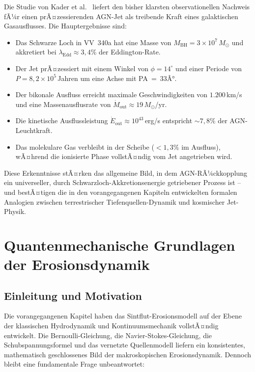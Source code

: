 ﻿\documentclass[12pt,a4paper]{report}
\begin{document}
Die Studie von Kader et al.\ \cite{kader2026} liefert den bisher klarsten observationellen Nachweis fÃ¼r einen prÃ¤zessierenden AGN-Jet als treibende Kraft eines galaktischen Gasausflusses. Die Hauptergebnisse sind:

\begin{itemize}
	\item Das Schwarze Loch in VV~340a hat eine Masse von $M_\mathrm{BH} = 3 \times 10^7\,M_\odot$ und akkretiert bei $\lambda_\mathrm{Edd} \approx 3{,}4\%$ der Eddington-Rate.
	\item Der Jet prÃ¤zessiert mit einem Winkel von $\phi = 14^\circ$ und einer Periode von $P = 8{,}2 \times 10^5$\,Jahren um eine Achse mit PA~=~33Â°.
	\item Der bikonale Ausfluss erreicht maximale Geschwindigkeiten von $1.200$\,km/s und eine Massenausflusrate von $\dot{M}_\mathrm{out} \approx 19\,M_\odot$/yr.
	\item Die kinetische Ausflussleistung $\dot{E}_\mathrm{out} \approx 10^{43}$\,erg/s entspricht $\sim 7{,}8\%$ der AGN-Leuchtkraft.
	\item Das molekulare Gas verbleibt in der Scheibe ($<1{,}3\%$ im Ausfluss), wÃ¤hrend die ionisierte Phase vollstÃ¤ndig vom Jet angetrieben wird.
\end{itemize}

Diese Erkenntnisse stÃ¤rken das allgemeine Bild, in dem AGN-RÃ¼ckkopplung ein universeller, durch Schwarzloch-Akkretionsenergie getriebener Prozess ist -- und bestÃ¤tigen die in den vorangegangenen Kapiteln entwickelten formalen Analogien zwischen terrestrischer Tiefenquellen-Dynamik und kosmischer Jet-Physik.


\chapter{Quantenmechanische Grundlagen der Erosionsdynamik}
\label{chap:quanten_erosion}

\section{Einleitung und Motivation}

Die vorangegangenen Kapitel haben das Sintflut-Erosionsmodell auf der Ebene der klassischen Hydrodynamik und Kontinuumsmechanik vollstÃ¤ndig entwickelt. Die Bernoulli-Gleichung, die Navier-Stokes-Gleichung, die Schubspannungsformel und das vernetzte Quellenmodell liefern ein konsistentes, mathematisch geschlossenes Bild der makroskopischen Erosionsdynamik. Dennoch bleibt eine fundamentale Frage unbeantwortet:
\end{document}
